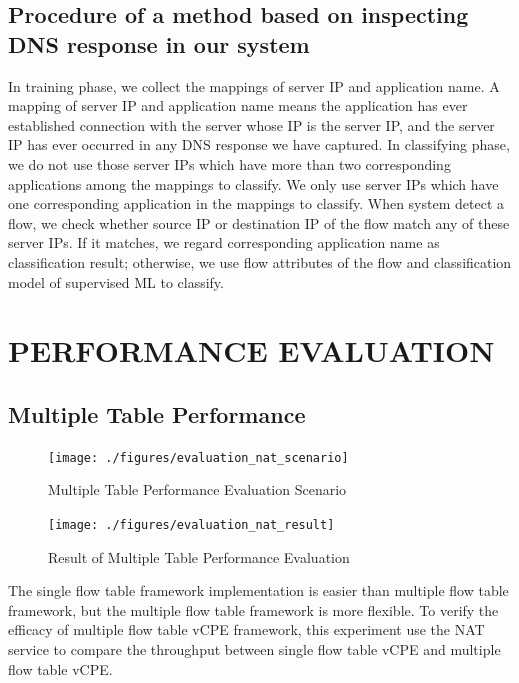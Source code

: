 \documentclass[journal]{IEEEtran}
\begin{document}
\subsection{Procedure of a method based on inspecting DNS response in our system}
In training phase, we collect the mappings of server IP and application name. A mapping of server IP and application name means the application has ever established connection with the server whose IP is the server IP, and the server IP has ever occurred in any DNS response we have captured.
In classifying phase, we do not use those server IPs which have more than two corresponding applications among the mappings to classify. We only use server IPs which have one corresponding application in the mappings to classify. When system detect a flow, we check whether source IP or destination IP of the flow match any of these server IPs. If it matches, we regard corresponding application name as classification result; otherwise, we use flow attributes of the flow and classification model of supervised ML to classify.





\section{PERFORMANCE EVALUATION}
\subsection{Multiple Table Performance}

\begin{figure}[!t]
\centering
\texttt{[image: ./figures/evaluation\_nat\_scenario]}
\caption{Multiple Table Performance Evaluation Scenario}
\label{fig:evaluation_nat_scenario}
\end{figure}

\begin{figure}[!t]
\centering
\texttt{[image: ./figures/evaluation\_nat\_result]}
\caption{Result of Multiple Table Performance Evaluation}
\label{fig:evaluation_nat_result}
\end{figure}

The single flow table framework implementation is easier than multiple flow table framework,
but the multiple flow table framework is more flexible.
To verify the efficacy of multiple flow table vCPE framework,
this experiment use the NAT service to compare the throughput between single flow table vCPE and multiple flow table vCPE.
\end{document}
